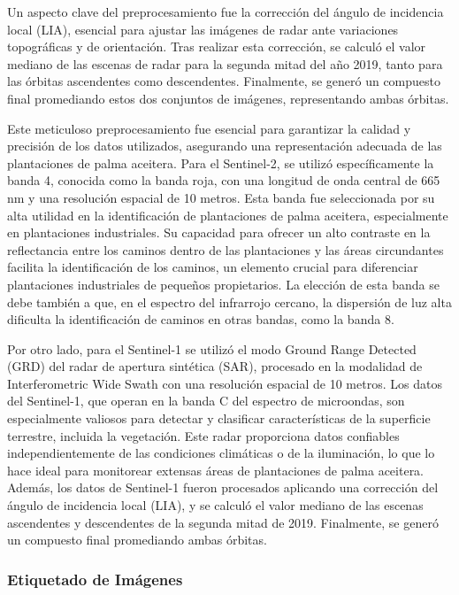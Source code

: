 Un aspecto clave del preprocesamiento fue la corrección del ángulo de incidencia local (LIA), esencial para ajustar las imágenes de radar ante variaciones topográficas y de orientación. Tras realizar esta corrección, se calculó el valor mediano de las escenas de radar para la segunda mitad del año 2019, tanto para las órbitas ascendentes como descendentes. Finalmente, se generó un compuesto final promediando estos dos conjuntos de imágenes, representando ambas órbitas.

Este meticuloso preprocesamiento fue esencial para garantizar la calidad y precisión de los datos utilizados, asegurando una representación adecuada de las plantaciones de palma aceitera. Para el Sentinel-2, se utilizó específicamente la banda 4, conocida como la banda roja, con una longitud de onda central de 665 nm y una resolución espacial de 10 metros. Esta banda fue seleccionada por su alta utilidad en la identificación de plantaciones de palma aceitera, especialmente en plantaciones industriales. Su capacidad para ofrecer un alto contraste en la reflectancia entre los caminos dentro de las plantaciones y las áreas circundantes facilita la identificación de los caminos, un elemento crucial para diferenciar plantaciones industriales de pequeños propietarios. La elección de esta banda se debe también a que, en el espectro del infrarrojo cercano, la dispersión de luz alta dificulta la identificación de caminos en otras bandas, como la banda 8.

Por otro lado, para el Sentinel-1 se utilizó el modo Ground Range Detected (GRD) del radar de apertura sintética (SAR), procesado en la modalidad de Interferometric Wide Swath con una resolución espacial de 10 metros. Los datos del Sentinel-1, que operan en la banda C del espectro de microondas, son especialmente valiosos para detectar y clasificar características de la superficie terrestre, incluida la vegetación. Este radar proporciona datos confiables independientemente de las condiciones climáticas o de la iluminación, lo que lo hace ideal para monitorear extensas áreas de plantaciones de palma aceitera. Además, los datos de Sentinel-1 fueron procesados aplicando una corrección del ángulo de incidencia local (LIA), y se calculó el valor mediano de las escenas ascendentes y descendentes de la segunda mitad de 2019. Finalmente, se generó un compuesto final promediando ambas órbitas.

\subsubsection{Etiquetado de Imágenes}

